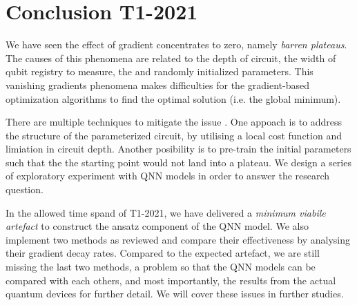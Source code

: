 \section{Conclusion T1-2021}
We have seen the effect of gradient concentrates to zero, namely \emph{barren plateaus}.
The causes of this phenomena are related to the depth of circuit, the width of qubit registry to measure, the and randomly initialized parameters.
This vanishing gradients phenomena makes difficulties for the gradient-based optimization algorithms to find the optimal solution (i.e. the global minimum).

There are multiple techniques to mitigate the issue \cite{cerezoCostFunctionDependent2021,skolikLayerwiseLearningQuantum2021,grantInitializationStrategyAddressing2019}.
One appoach is to address the structure of the parameterized circuit, by utilising a local cost function and limiation in circuit depth.
Another posibility is to pre-train the initial parameters such that the the starting point would not land into a plateau.
We design a series of exploratory experiment with QNN models in order to answer the research question.

In the allowed time spand of T1-2021, we have delivered a \emph{minimum viabile artefact} to construct the ansatz component of the QNN model.
We also implement two methods as reviewed and compare their effectiveness by analysing their gradient decay rates.
Compared to the expected artefact, we are still missing the last two methods, a problem so that the QNN models can be compared with each others, and most importantly, the results from the actual quantum devices  for further detail.
We will cover these issues in further studies.